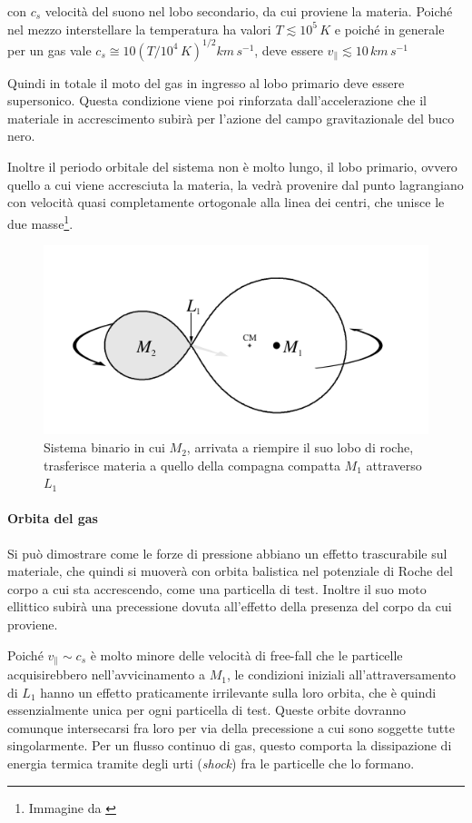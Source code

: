 \documentclass[a4paperbi]{article}
\begin{document}
	con $c_{s}$ velocità del suono nel lobo secondario, da cui proviene la materia. Poiché nel mezzo interstellare la temperatura ha valori $T\lesssim10^5\,K$ e poiché in generale per un gas vale $c_s\cong10(T/10^4\,K)^{1/2}km\,s^{-1}$, deve essere $v_\parallel\lesssim10\,km\,s^{-1}$
	
	Quindi in totale il moto del gas in ingresso al lobo primario deve essere supersonico. Questa condizione viene poi rinforzata dall'accelerazione che il materiale in accrescimento subirà per l'azione del campo gravitazionale del buco nero.
	
	Inoltre il periodo orbitale del sistema non è molto lungo, il lobo primario, ovvero quello a cui viene accresciuta la materia, la vedrà provenire dal punto lagrangiano con velocità quasi completamente ortogonale alla linea dei centri, che unisce le due masse\footnote{Immagine da \cite{FrankKingRaineAccretionPower}}.
	
	\begin{figure}[H]
		\centering
		\includegraphics[width=0.8\linewidth]{LobeFilling}
		\caption{Sistema binario in cui $M_2$, arrivata a riempire il suo lobo di roche, trasferisce materia a quello della compagna compatta $M_1$ attraverso $L_1$}
		\label{fig:lobefilling}
	\end{figure}
	

	\paragraph{Orbita del gas}	
	Si può dimostrare come le forze di pressione abbiano un effetto trascurabile sul materiale, che quindi si muoverà con orbita balistica nel potenziale di Roche del corpo a cui sta accrescendo, come una particella di test. Inoltre il suo moto ellittico subirà una precessione dovuta all'effetto della presenza del corpo da cui proviene.
	
	Poiché $v_\parallel\sim c_s$ è molto minore delle velocità di free-fall che le particelle acquisirebbero nell'avvicinamento a $M_1$, le condizioni iniziali all'attraversamento di $L_1$ hanno un effetto praticamente irrilevante sulla loro orbita, che è quindi essenzialmente unica per ogni particella di test. Queste orbite dovranno comunque intersecarsi fra loro per via della precessione a cui sono soggette tutte singolarmente. Per un flusso continuo di gas, questo comporta la dissipazione di energia termica tramite degli urti (\textit{shock}) fra le particelle che lo formano. 
	
\end{document}
